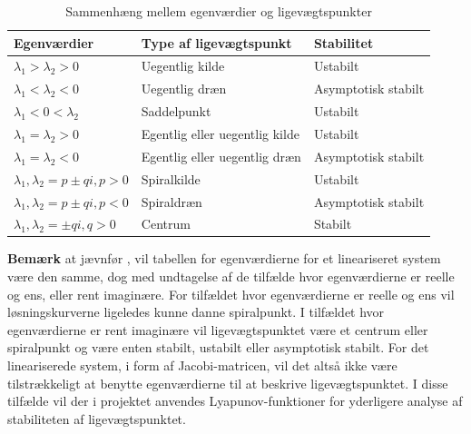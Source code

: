\begin{table} [H]
\centering 
    \begin{tabular}{|l|l|l|}
    \hline
    \textbf{Egenværdier}                                    & \textbf{Type af ligevægtspunkt}            & \textbf{Stabilitet}          \\ \hline
    $\lambda_1 > \lambda_2 > 0$                     & Uegentlig kilde                   & Ustabilt            \\ \hline
    $\lambda_1 < \lambda_2 < 0$                     & Uegentlig dræn                    & Asymptotisk stabilt \\ \hline
    $\lambda_1 < 0 < \lambda_2$                     & Saddelpunkt                       & Ustabilt            \\ \hline
    $\lambda_1 = \lambda_2 > 0$                     & Egentlig eller uegentlig kilde    & Ustabilt            \\ \hline
    $\lambda_1 = \lambda_2 < 0$                     & Egentlig eller uegentlig dræn     & Asymptotisk stabilt \\ \hline
    $\lambda_1, \lambda_2 =p \pm qi, p > 0$         & Spiralkilde                       & Ustabilt            \\ \hline
    $\lambda_1, \lambda_2 =p \pm qi, p < 0$         & Spiraldræn                        & Asymptotisk stabilt \\ \hline
    $\lambda_1, \lambda_2 = \pm qi, q > 0$          & Centrum                           & Stabilt             \\ \hline
    \end{tabular}
\caption{Sammenhæng mellem egenværdier og ligevægtspunkter}\label{tab:egenvardi}
\end{table}

\textbf{Bemærk} at jævnfør \citep[s. 738]{FDEB}, vil tabellen for egenværdierne for et lineariseret system være den samme, dog med undtagelse af de tilfælde hvor egenværdierne er reelle og ens, eller rent imaginære. For tilfældet hvor egenværdierne er reelle og ens vil løsningskurverne ligeledes kunne danne spiralpunkt. I tilfældet hvor egenværdierne er rent imaginære vil ligevægtspunktet være et centrum eller spiralpunkt og være enten stabilt, ustabilt eller asymptotisk stabilt. For det lineariserede system, i form af Jacobi-matricen, vil det altså ikke være tilstrækkeligt at benytte egenværdierne til at beskrive ligevægtspunktet. I disse tilfælde vil der i projektet anvendes Lyapunov-funktioner for yderligere analyse af stabiliteten af ligevægtspunktet.



